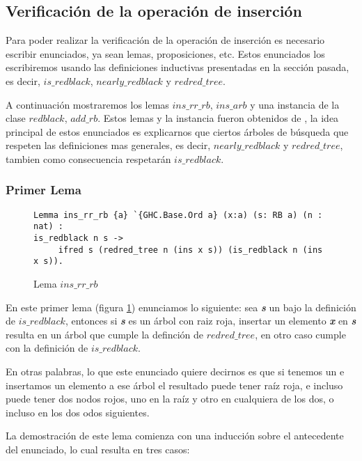\subsection{Verificación de la operación de inserción}

Para poder realizar la verificaci\'on de la operaci\'on de inserci\'on es necesario escribir
enunciados, ya sean lemas, proposiciones, etc. Estos enunciados los escribiremos usando las definiciones inductivas presentadas en
la secci\'on pasada, es decir, $is\_redblack$, $nearly\_redblack$ y $redred\_tree$.

A continuaci\'on mostraremos los lemas $ins\_rr\_rb$, $ins\_arb$ y una instancia \cite{classes}
de la clase $redblack$, $add\_rb$. Estos lemas y la instancia fueron obtenidos de \cite{MSetRBT},
la idea principal de estos enunciados es explicarnos que ciertos \'arboles de b\'usqueda que respeten las definiciones
mas generales, es decir, $nearly\_redblack$ y $redred\_tree$, tambien como consecuencia respetar\'an
$is\_redblack$.

\subsubsection{Primer Lema}

\begin{figure}[!ht]
\centering
\captionsetup{justification=centering}
\begin{verbatim}
Lemma ins_rr_rb {a} `{GHC.Base.Ord a} (x:a) (s: RB a) (n : nat) :
is_redblack n s ->
     ifred s (redred_tree n (ins x s)) (is_redblack n (ins x s)).
\end{verbatim}
\caption{Lema $ins\_rr\_rb$}
\label{lema_1}
\end{figure}

En este primer lema (figura \ref{lema_1}) enunciamos lo siguiente: sea \textit{\textbf{s}} un {\arn} bajo la
definici\'on de $is\_redblack$, entonces si \textit{\textbf{s}} es un \'arbol con raiz roja, insertar un elemento
\textit{\textbf{x}} en \textit{\textbf{s}} resulta en un \'arbol que cumple la definci\'on de $redred\_tree$, en otro caso cumple
con la definici\'on de $is\_redblack$.

En otras palabras, lo que este enunciado quiere decirnos es que si tenemos un {\arn} e insertamos
un elemento a ese \'arbol el resultado puede tener ra\'iz roja, e incluso puede tener dos nodos
rojos, uno en la ra\'iz y otro en cualquiera de los dos, o incluso en los dos odos siguientes.

La demostraci\'on de este lema comienza con una inducci\'on sobre el antecedente del enunciado, lo cual
resulta en tres casos:

